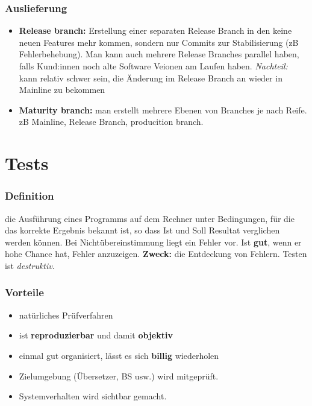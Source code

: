 \documentclass{book}
\begin{document}
    \subsection{Auslieferung}
    \begin{itemize}
        \item \textbf{Release branch:} Erstellung einer separaten Release Branch in den keine neuen Features mehr kommen, sondern nur Commits zur Stabilisierung (zB Fehlerbehebung).  Man kann auch mehrere Release Branches parallel haben, falls Kund:innen noch alte Software Veionen am Laufen haben.
        \textit{Nachteil:} kann relativ schwer sein, die Änderung im Release Branch an wieder in Mainline zu bekommen
        \item \textbf{Maturity branch:} man erstellt mehrere Ebenen von Branches je nach Reife. zB Mainline, Release Branch, producition branch.
    \end{itemize}

    \chapter{Tests}
    \subsection{Definition} die Ausführung eines Programms auf dem Rechner unter Bedingungen, für die das korrekte Ergebnis bekannt ist, so dass Ist und Soll Resultat verglichen werden können. Bei Nichtübereinstimmung liegt ein Fehler vor. \newline
    Ist \textbf{gut}, wenn er hohe Chance hat, Fehler anzuzeigen.
    \newline
    \textbf{Zweck:} die Entdeckung von Fehlern.
    Testen ist \textit{destruktiv}.
    \subsection{Vorteile}
    \begin{itemize}
        \item natürliches Prüfverfahren
        \item ist \textbf{reproduzierbar} und damit \textbf{objektiv}
        \item einmal gut organisiert, lässt es sich \textbf{billig} wiederholen
        \item Zielumgebung (Übersetzer, BS usw.) wird mitgeprüft.
        \item Systemverhalten wird sichtbar gemacht.
    \end{itemize}
\end{document}
